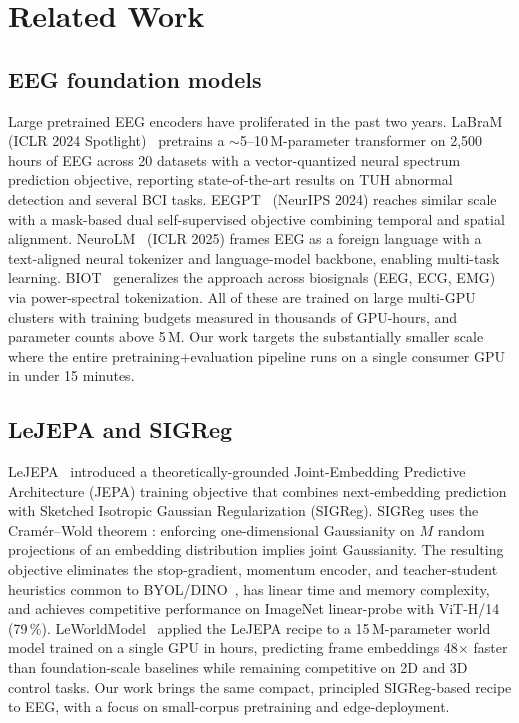 \section{Related Work}
\label{sec:related}

\subsection{EEG foundation models}

Large pretrained EEG encoders have proliferated in the past two years. LaBraM
(ICLR 2024 Spotlight)~\cite{labram2024} pretrains a $\sim$5--10\,M-parameter
transformer on 2{,}500 hours of EEG across 20 datasets with a vector-quantized
neural spectrum prediction objective, reporting state-of-the-art results on
TUH abnormal detection and several BCI tasks. EEGPT~\cite{eegpt2024} (NeurIPS
2024) reaches similar scale with a mask-based dual self-supervised objective
combining temporal and spatial alignment. NeuroLM~\cite{neurolm2025} (ICLR
2025) frames EEG as a foreign language with a text-aligned neural tokenizer
and language-model backbone, enabling multi-task learning. BIOT~\cite{biot2023}
generalizes the approach across biosignals (EEG, ECG, EMG) via power-spectral
tokenization. All of these are trained on large multi-GPU clusters with
training budgets measured in thousands of GPU-hours, and parameter counts
above 5\,M. Our work targets the substantially smaller scale where the entire
pretraining$+$evaluation pipeline runs on a single consumer GPU in under 15
minutes.

\subsection{LeJEPA and SIGReg}

LeJEPA~\cite{lejepa2025} introduced a theoretically-grounded
Joint-Embedding Predictive Architecture (JEPA) training objective that
combines next-embedding prediction with Sketched Isotropic Gaussian
Regularization (SIGReg). SIGReg uses the Cram\'er--Wold theorem
\cite{cramerwold1936}: enforcing one-dimensional Gaussianity on $M$ random
projections of an embedding distribution implies joint Gaussianity. The
resulting objective eliminates the stop-gradient, momentum encoder, and
teacher-student heuristics common to BYOL/DINO~\cite{byol2020,dino2021}, has
linear time and memory complexity, and achieves competitive performance on
ImageNet linear-probe with ViT-H/14 (79\,\%). LeWorldModel~\cite{lewm2026}
applied the LeJEPA recipe to a 15\,M-parameter world model trained on a
single GPU in hours, predicting frame embeddings 48$\times$ faster than
foundation-scale baselines while remaining competitive on 2D and 3D control
tasks. Our work brings the same compact, principled SIGReg-based recipe to
EEG, with a focus on small-corpus pretraining and edge-deployment.

